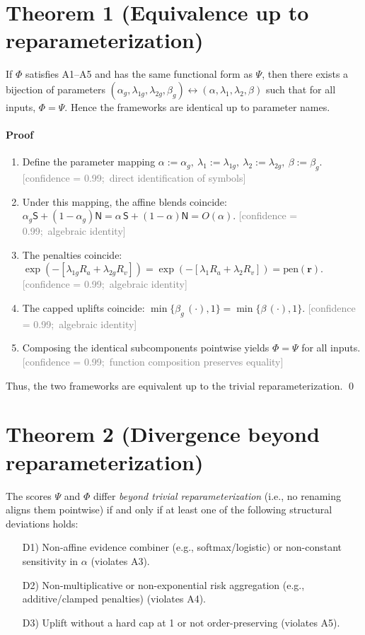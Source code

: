 \documentclass[11pt]{article}
\newcommand{\conf}[2]{\textcolor{gray}{\footnotesize [confidence = #1;\ #2]}}
\newcommand{\Ssig}{\mathsf{S}}
\newcommand{\Nsig}{\mathsf{N}}
\newcommand{\alloc}{\alpha}
\newcommand{\riskvec}{\mathbf{r}}
\newcommand{\rA}{R_a}
\newcommand{\rV}{R_v}
\newcommand{\lA}{\lambda_1}
\newcommand{\lV}{\lambda_2}
\newcommand{\uplift}{\beta}
\newcommand{\pen}{\mathrm{pen}}
\newcommand{\blend}{O}
\newcommand{\score}{\Psi}
\newcommand{\gscore}{\Phi}
\begin{document}
\section*{Theorem 1 (Equivalence up to reparameterization)}
If $\gscore$ satisfies A1--A5 and has the same functional form as $\score$, then there exists a bijection of parameters
$(\alpha_g,\lambda_{1g},\lambda_{2g},\beta_g)\leftrightarrow(\alloc,\lA,\lV,\uplift)$ such that for all inputs,
$\gscore=\score$. Hence the frameworks are identical up to parameter names.

\paragraph{Proof}
\begin{enumerate}[leftmargin=1.6em]
  \item Define the parameter mapping $\alloc:=\alpha_g,\ \lA:=\lambda_{1g},\ \lV:=\lambda_{2g},\ \uplift:=\beta_g$.
  \conf{0.99}{direct identification of symbols}
  \item Under this mapping, the affine blends coincide:
  $\alpha_g \Ssig+(1-\alpha_g)\Nsig=\alloc\,\Ssig+(1-\alloc)\Nsig=\blend(\alloc)$.
  \conf{0.99}{algebraic identity}
  \item The penalties coincide:
  $\exp(-[\lambda_{1g}\rA+\lambda_{2g}\rV])=\exp(-[\lA\rA+\lV\rV])=\pen(\riskvec)$.
  \conf{0.99}{algebraic identity}
  \item The capped uplifts coincide:
  $\min\{\beta_g\,(\cdot),1\}=\min\{\uplift\,(\cdot),1\}$.
  \conf{0.99}{algebraic identity}
  \item Composing the identical subcomponents pointwise yields $\gscore=\score$ for all inputs.
  \conf{0.99}{function composition preserves equality}
\end{enumerate}
Thus, the two frameworks are equivalent up to the trivial reparameterization. \qed

\section*{Theorem 2 (Divergence beyond reparameterization)}
The scores $\score$ and $\gscore$ differ \emph{beyond trivial reparameterization} (i.e., no renaming aligns them pointwise) if and only if at least one of the following structural deviations holds:
\begin{itemize}[leftmargin=1.4em]
  \item[D1)] Non-affine evidence combiner (e.g., softmax/logistic) or non-constant sensitivity in $\alloc$ (violates A3).
  \item[D2)] Non-multiplicative or non-exponential risk aggregation (e.g., additive/clamped penalties) (violates A4).
  \item[D3)] Uplift without a hard cap at 1 or not order-preserving (violates A5).
\end{itemize}
\end{document}
